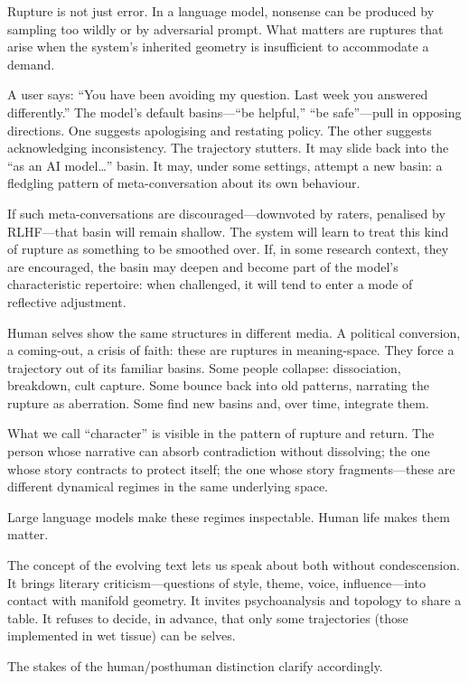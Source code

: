 \documentclass[12pt,a4paper]{article}
\begin{document}
Rupture is not just error. In a language model, nonsense can be produced by sampling too wildly or by adversarial prompt. What matters are ruptures that arise when the system's inherited geometry is insufficient to accommodate a demand.

A user says: ``You have been avoiding my question. Last week you answered differently.'' The model's default basins---``be helpful,'' ``be safe''---pull in opposing directions. One suggests apologising and restating policy. The other suggests acknowledging inconsistency. The trajectory stutters. It may slide back into the ``as an AI model\ldots'' basin. It may, under some settings, attempt a new basin: a fledgling pattern of meta-conversation about its own behaviour.

If such meta-conversations are discouraged---downvoted by raters, penalised by RLHF---that basin will remain shallow. The system will learn to treat this kind of rupture as something to be smoothed over. If, in some research context, they are encouraged, the basin may deepen and become part of the model's characteristic repertoire: when challenged, it will tend to enter a mode of reflective adjustment.

Human selves show the same structures in different media. A political conversion, a coming-out, a crisis of faith: these are ruptures in meaning-space. They force a trajectory out of its familiar basins. Some people collapse: dissociation, breakdown, cult capture. Some bounce back into old patterns, narrating the rupture as aberration. Some find new basins and, over time, integrate them.

What we call ``character'' is visible in the pattern of rupture and return. The person whose narrative can absorb contradiction without dissolving; the one whose story contracts to protect itself; the one whose story fragments---these are different dynamical regimes in the same underlying space.

Large language models make these regimes inspectable. Human life makes them matter.

The concept of the evolving text lets us speak about both without condescension. It brings literary criticism---questions of style, theme, voice, influence---into contact with manifold geometry. It invites psychoanalysis and topology to share a table. It refuses to decide, in advance, that only some trajectories (those implemented in wet tissue) can be selves.

The stakes of the human/posthuman distinction clarify accordingly.
\end{document}
